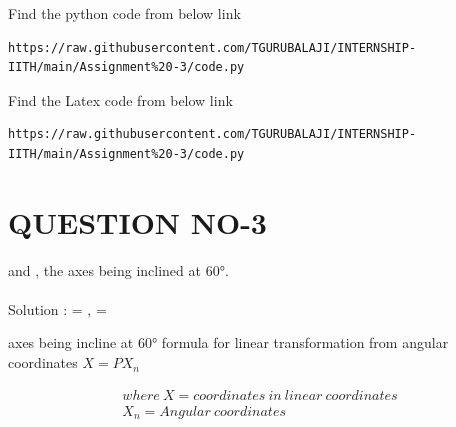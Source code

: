 \documentclass[journal,12pt,twocolumn]{IEEEtran}
\begin{document}
\maketitle
\newpage
\bigskip
\renewcommand{\thefigure}{\theenumi}
\renewcommand{\thetable}{\theenumi}
% 
Find the python code from below link
% 
\begin{lstlisting}
https://raw.githubusercontent.com/TGURUBALAJI/INTERNSHIP-IITH/main/Assignment%20-3/code.py
\end{lstlisting}
% 
Find the Latex code from below link
% 
\begin{lstlisting}
https://raw.githubusercontent.com/TGURUBALAJI/INTERNSHIP-IITH/main/Assignment%20-3/code.py
\end{lstlisting}

\section{QUESTION NO-3}
 \noindent {} and , the axes being inclined at \ang{60}.\\  
 
 \
 \\{Solution}
 :
 = ,  =
 
 axes being incline at \ang{60} formula for linear transformation from angular coordinates 
 $X = PX_{n}$

\begin{align}
	where\ X= coordinates\ in \ linear \ coordinates\\
	X_{n}=Angular\ coordinates
\end{align}
\end{document}
